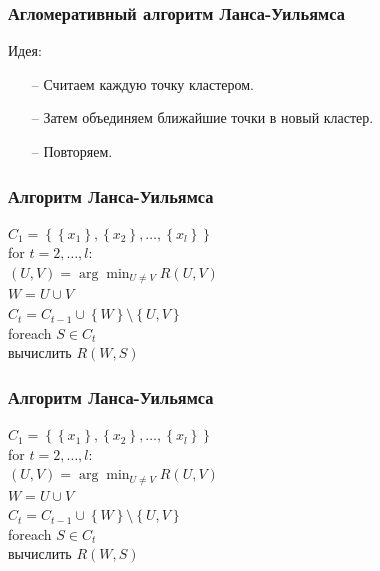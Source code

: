 \documentclass[12pt]{beamer}
\begin{document}
\begin{frame}\frametitle{Агломеративный алгоритм Ланса-Уильямса}
Идея:\\
\begin{itemize}
\item[--] Считаем каждую точку кластером. 
\item[--] Затем объединяем ближайшие точки в новый кластер. 
\item[--] Повторяем.
\end{itemize}
\end{frame}


\begin{frame}\frametitle{Алгоритм Ланса-Уильямса}

${C_1 = \left\{ \left\{ x_1\right\}, \left\{x_2 \right\}, \dots, \left\{x_l \right\} \right\}}$\\
for ${t=2, \dots, l }$:\\
\hspace{5mm} ${(U, V) = \arg\min_{U \neq V} R(U, V)}$\\
\hspace{5mm} $W = U \cup V$\\
\hspace{5mm} ${C_t = C_{t-1} \cup \left\{ W \right\}\setminus \left\{U, V \right\} }$\\
\hspace{5mm} foreach ${S \in C_t}$\\
\hspace{10mm}   вычислить $R(W, S)$\\

\end{frame}

\begin{frame}\frametitle{Алгоритм Ланса-Уильямса}

${C_1 = \left\{ \left\{ x_1\right\}, \left\{x_2 \right\}, \dots, \left\{x_l \right\} \right\}}$\\
for ${t=2, \dots, l }$:\\
\hspace{5mm} ${(U, V) = \arg\min_{U \neq V} R(U, V)}$\\
\hspace{5mm} $W = U \cup V$\\
\hspace{5mm} ${C_t = C_{t-1} \cup \left\{ W \right\}\setminus \left\{U, V \right\} }$\\
\hspace{5mm} foreach ${S \in C_t}$\\
\hspace{10mm}   вычислить $R(W, S)$\\

\end{frame}
\end{document}
